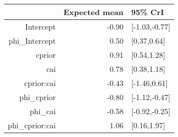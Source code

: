 \begin{tabular}{rrl}
  \hline
 & Expected mean & 95\% CrI \\ 
  \hline
Intercept & -0.90 & [-1.03,-0.77] \\ 
  phi\_Intercept & 0.50 & [0.37,0.64] \\ 
  cprior & 0.91 & [0.54,1.28] \\ 
  cai & 0.78 & [0.38,1.18] \\ 
  cprior:cai & -0.43 & [-1.46,0.61] \\ 
  phi\_cprior & -0.80 & [-1.12,-0.47] \\ 
  phi\_cai & -0.58 & [-0.92,-0.25] \\ 
  phi\_cprior:cai & 1.06 & [0.16,1.97] \\ 
   \hline
\end{tabular}

